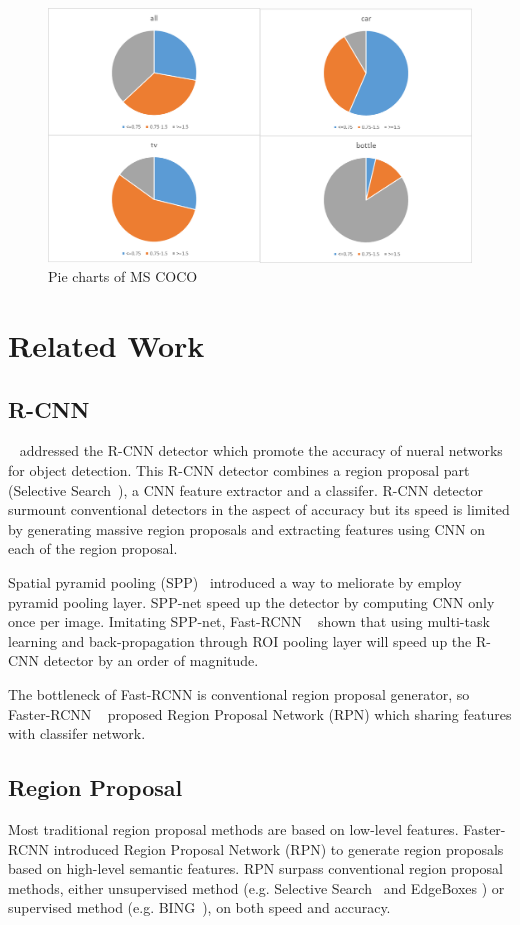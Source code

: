 \documentclass[10pt,twocolumn,letterpaper]{article}
\begin{document}
\begin{figure}[h]
\centering
\includegraphics[width=0.7\linewidth]{pic/dist_pics/pies_coco}
\caption{Pie charts of MS COCO}
\label{fig:piescoco}
\end{figure}

\section{Related Work}
	\label{sec:related-work}

\subsection{R-CNN}
~\cite{RCNN} addressed the R-CNN detector which promote the accuracy of nueral networks for object detection. This R-CNN detector combines a region proposal part (Selective Search~\cite{SelectiveSearch}), a CNN feature extractor and a classifer. R-CNN detector surmount conventional detectors in the aspect of accuracy but its speed is limited by generating massive region proposals and extracting features using CNN on each of the region proposal. 

Spatial pyramid pooling (SPP)~\cite{SPP} introduced a way to meliorate by employ pyramid pooling layer. SPP-net speed up the detector by computing CNN only once per image. Imitating SPP-net, Fast-RCNN ~\cite{fastRCNN} shown that using multi-task learning and back-propagation through ROI pooling layer will speed up the R-CNN detector by an order of magnitude. 

The bottleneck of Fast-RCNN is conventional region proposal generator, so Faster-RCNN ~\cite{fasterRCNN} proposed Region Proposal Network (RPN) which sharing features with classifer network.


\subsection{Region Proposal}
Most traditional region proposal methods are based on low-level features. Faster-RCNN introduced Region Proposal Network (RPN) to generate region proposals based on high-level semantic features. RPN surpass conventional region proposal methods, either unsupervised method (e.g. Selective Search~\cite{SelectiveSearch} and EdgeBoxes \cite{EdgeBoxes}) or supervised method (e.g. BING~\cite{BING}), on both speed and accuracy.
\end{document}
